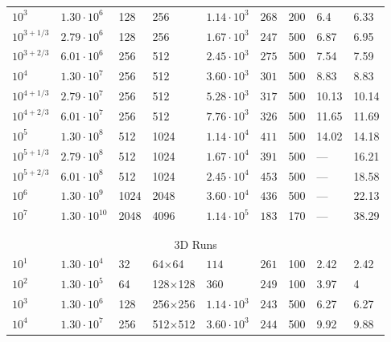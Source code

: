 \documentclass[aps, pre, onecolumn, nofootinbib, notitlepage, groupedaddress, amsfonts, amssymb, amsmath, longbibliography]{revtex4-1}
\begin{document}
\begin{table}
\begin{center}
\begin{tabularx}{\textwidth}{ X X X X | X X X | X X }
$10^3$	&	$1.30 \cdot 10^6$	&	128	&	256	&	$1.14 \cdot 10^3$	&	$268$	&	200	&	6.4	&	6.33	\\
$10^{3 + 1/3}$	&	$2.79 \cdot 10^6$	&	128	&	256	&	$1.67 \cdot 10^3$	&	$247$	&	500	&	6.87	&	6.95	\\
$10^{3 + 2/3}$	&	$6.01 \cdot 10^6$	&	256	&	512	&	$2.45 \cdot 10^3$	&	$275$	&	500	&	7.54	&	7.59	\\
$10^4$	&	$1.30 \cdot 10^7$	&	256	&	512	&	$3.60 \cdot 10^3$	&	$301$	&	500	&	8.83	&	8.83	\\
$10^{4 + 1/3}$	&	$2.79 \cdot 10^7$	&	256	&	512	&	$5.28 \cdot 10^3$	&	$317$	&	500	&	10.13	&	10.14	\\
$10^{4 + 2/3}$	&	$6.01 \cdot 10^7$	&	256	&	512	&	$7.76 \cdot 10^3$	&	$326$	&	500	&	11.65	&	11.69	\\
$10^5$	&	$1.30 \cdot 10^8$	&	512	&	1024	&	$1.14 \cdot 10^4$	&	$411$	&	500	&	14.02	&	14.18	\\
$10^{5 + 1/3}$	&	$2.79 \cdot 10^8$	&	512	&	1024	&	$1.67 \cdot 10^4$	&	$391$	&	500	&	---	&	16.21	\\
$10^{5 + 2/3}$	&	$6.01 \cdot 10^8$	&	512	&	1024	&	$2.45 \cdot 10^4$	&	$453$	&	500	&	---	&	18.58	\\
$10^6$	&	$1.30 \cdot 10^9$	&	1024	&	2048	&	$3.60 \cdot 10^4$	&	$436$	&	500	&	---	&	22.13	\\
$10^7$	&	$1.30 \cdot 10^{10}$	&	2048	&	4096	&	$1.14 \cdot 10^5$	&	$183$	&	170	&	---	&	38.29	\\
\\ \hline \hline \multicolumn{9}{c}{\vspace{-0.2cm}}\\
\multicolumn{9}{c}{\vspace{0.1cm}3D Runs} \\
\hline
$10^1$	&	$1.30 \cdot 10^4$	&	32	&	64$\times$64	&	$114$	&	$261$	&	100	&	2.42	&	2.42	\\
$10^2$	&	$1.30 \cdot 10^5$	&	64	&	128$\times$128	&	$360$	&	$249$	&	100	&	3.97	&	4	\\
$10^3$	&	$1.30 \cdot 10^6$	&	128	&	256$\times$256	&	$1.14 \cdot 10^3$	&	$243$	&	500	&	6.27	&	6.27	\\
$10^4$	&	$1.30 \cdot 10^7$	&	256	&	512$\times$512	&	$3.60 \cdot 10^3$	&	$244$	&	500	&	9.92	&	9.88	\\
\hline																	
\end{tabularx}
\end{center}
\end{table}


\newpage
\end{document}
